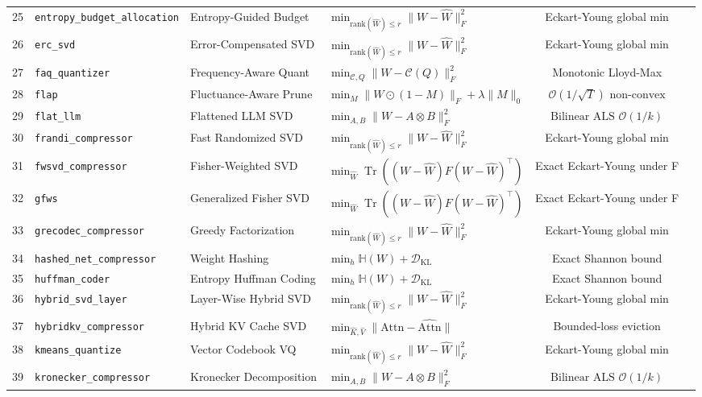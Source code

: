 \begin{center}
\begin{longtable}{rlllcc}
25 & \texttt{entropy\_budget\_allocation} & Entropy-Guided Budget & $\min_{\text{rank}(\hat{W})\le r} \|W - \hat{W}\|_F^2$ & Eckart-Young global min \\
26 & \texttt{erc\_svd} & Error-Compensated SVD & $\min_{\text{rank}(\hat{W})\le r} \|W - \hat{W}\|_F^2$ & Eckart-Young global min \\
27 & \texttt{faq\_quantizer} & Frequency-Aware Quant & $\min_{\mathcal{C}, Q} \|W - \mathcal{C}(Q)\|_F^2$ & Monotonic Lloyd-Max \\
28 & \texttt{flap} & Fluctuance-Aware Prune & $\min_M \|W \odot (1-M)\|_F + \lambda \|M\|_0$ & $\mathcal{O}(1/\sqrt{T}) \text{ non-convex}$ \\
29 & \texttt{flat\_llm} & Flattened LLM SVD & $\min_{A, B} \|W - A \otimes B\|_F^2$ & $\text{Bilinear ALS } \mathcal{O}(1/k)$ \\
30 & \texttt{frandi\_compressor} & Fast Randomized SVD & $\min_{\text{rank}(\hat{W})\le r} \|W - \hat{W}\|_F^2$ & Eckart-Young global min \\
31 & \texttt{fwsvd\_compressor} & Fisher-Weighted SVD & $\min_{\hat{W}} \operatorname{Tr}((W-\hat{W}) F (W-\hat{W})^\top)$ & Exact Eckart-Young under  F \\
32 & \texttt{gfws} & Generalized Fisher SVD & $\min_{\hat{W}} \operatorname{Tr}((W-\hat{W}) F (W-\hat{W})^\top)$ & Exact Eckart-Young under  F \\
33 & \texttt{grecodec\_compressor} & Greedy Factorization & $\min_{\text{rank}(\hat{W})\le r} \|W - \hat{W}\|_F^2$ & Eckart-Young global min \\
34 & \texttt{hashed\_net\_compressor} & Weight Hashing & $\min_h \mathbb{H}(W) + \mathcal{D}_{\text{KL}}$ & Exact Shannon bound \\
35 & \texttt{huffman\_coder} & Entropy Huffman Coding & $\min_h \mathbb{H}(W) + \mathcal{D}_{\text{KL}}$ & Exact Shannon bound \\
36 & \texttt{hybrid\_svd\_layer} & Layer-Wise Hybrid SVD & $\min_{\text{rank}(\hat{W})\le r} \|W - \hat{W}\|_F^2$ & Eckart-Young global min \\
37 & \texttt{hybridkv\_compressor} & Hybrid KV Cache SVD & $\min_{\hat{K},\hat{V}} \|\text{Attn} - \hat{\text{Attn}}\|$ & Bounded-loss eviction \\
38 & \texttt{kmeans\_quantize} & Vector Codebook VQ & $\min_{\text{rank}(\hat{W})\le r} \|W - \hat{W}\|_F^2$ & Eckart-Young global min \\
39 & \texttt{kronecker\_compressor} & Kronecker Decomposition & $\min_{A, B} \|W - A \otimes B\|_F^2$ & $\text{Bilinear ALS } \mathcal{O}(1/k)$ \\

\end{longtable}
\end{center}
